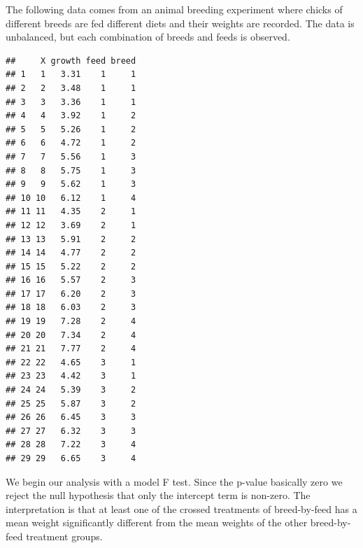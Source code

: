 \documentclass[
]{book}
\newenvironment{Shaded}{\begin{snugshade}}{\end{snugshade}}
\newcommand{\FunctionTok}[1]{\textcolor[rgb]{0.00,0.00,0.00}{#1}}
\newcommand{\NormalTok}[1]{#1}
\newcommand{\OtherTok}[1]{\textcolor[rgb]{0.56,0.35,0.01}{#1}}
\newcommand{\SpecialCharTok}[1]{\textcolor[rgb]{0.00,0.00,0.00}{#1}}
\newcommand{\StringTok}[1]{\textcolor[rgb]{0.31,0.60,0.02}{#1}}
\begin{document}
The following data comes from an animal breeding experiment where chicks of different breeds are fed different diets and their weights are recorded. The data is unbalanced, but each combination of breeds and feeds is observed.

\begin{Shaded}
\end{Shaded}

\begin{verbatim}
##     X growth feed breed
## 1   1   3.31    1     1
## 2   2   3.48    1     1
## 3   3   3.36    1     1
## 4   4   3.92    1     2
## 5   5   5.26    1     2
## 6   6   4.72    1     2
## 7   7   5.56    1     3
## 8   8   5.75    1     3
## 9   9   5.62    1     3
## 10 10   6.12    1     4
## 11 11   4.35    2     1
## 12 12   3.69    2     1
## 13 13   5.91    2     2
## 14 14   4.77    2     2
## 15 15   5.22    2     2
## 16 16   5.57    2     3
## 17 17   6.20    2     3
## 18 18   6.03    2     3
## 19 19   7.28    2     4
## 20 20   7.34    2     4
## 21 21   7.77    2     4
## 22 22   4.65    3     1
## 23 23   4.42    3     1
## 24 24   5.39    3     2
## 25 25   5.87    3     2
## 26 26   6.45    3     3
## 27 27   6.32    3     3
## 28 28   7.22    3     4
## 29 29   6.65    3     4
\end{verbatim}

We begin our analysis with a model F test. Since the p-value basically zero we reject the null hypothesis that only the intercept term is non-zero. The interpretation is that at least one of the crossed treatments of breed-by-feed has a mean weight significantly different from the mean weights of the other breed-by-feed treatment groups.
\end{document}
